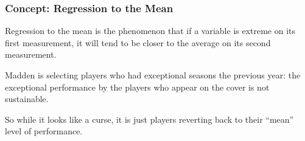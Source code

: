 \documentclass[slides]{beamer}
\newcommand{\blue}[1]{\textcolor{blue2}{#1}}
\begin{document}
\begin{frame}[fragile]
\frametitle{Concept: Regression to the Mean}

%
%
\blue{Regression to the mean} is the phenomenon that if a variable is extreme on its first measurement, it will tend to be closer to the average on its second measurement.
\vspace{0.5cm}

\pause Madden is selecting players who had \blue{exceptional} seasons the previous year: the exceptional performance by the players who appear on the cover is \blue{not sustainable}.  

\vspace{0.5cm}

\pause So while it looks like a curse, it is just players reverting back to their ``mean'' level of performance.  

\end{frame}


%
%
\end{document}
